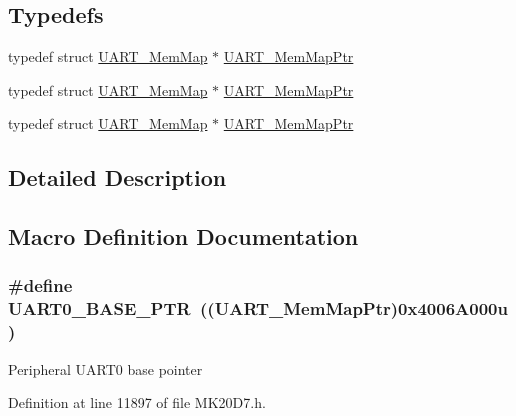 \subsection*{Typedefs}
\begin{DoxyCompactItemize}
\item 
typedef struct \hyperlink{struct_u_a_r_t___mem_map}{U\+A\+R\+T\+\_\+\+Mem\+Map} $\ast$ \hyperlink{group___u_a_r_t___peripheral_ga306cf44b593fadbb29a065f42e3f68f0}{U\+A\+R\+T\+\_\+\+Mem\+Map\+Ptr}
\item 
typedef struct \hyperlink{struct_u_a_r_t___mem_map}{U\+A\+R\+T\+\_\+\+Mem\+Map} $\ast$ \hyperlink{group___u_a_r_t___peripheral_ga306cf44b593fadbb29a065f42e3f68f0}{U\+A\+R\+T\+\_\+\+Mem\+Map\+Ptr}
\item 
typedef struct \hyperlink{struct_u_a_r_t___mem_map}{U\+A\+R\+T\+\_\+\+Mem\+Map} $\ast$ \hyperlink{group___u_a_r_t___peripheral_ga306cf44b593fadbb29a065f42e3f68f0}{U\+A\+R\+T\+\_\+\+Mem\+Map\+Ptr}
\end{DoxyCompactItemize}


\subsection{Detailed Description}


\subsection{Macro Definition Documentation}
\subsubsection[{\texorpdfstring{U\+A\+R\+T0\+\_\+\+B\+A\+S\+E\+\_\+\+P\+TR}{UART0_BASE_PTR}}]{\setlength{\rightskip}{0pt plus 5cm}\#define U\+A\+R\+T0\+\_\+\+B\+A\+S\+E\+\_\+\+P\+TR~(({\bf U\+A\+R\+T\+\_\+\+Mem\+Map\+Ptr})0x4006\+A000u)}\hypertarget{group___u_a_r_t___peripheral_ga50a02c91ffbd11fa7b4f0c33fe585199}{}\label{group___u_a_r_t___peripheral_ga50a02c91ffbd11fa7b4f0c33fe585199}
Peripheral U\+A\+R\+T0 base pointer 

Definition at line 11897 of file M\+K20\+D7.\+h.

